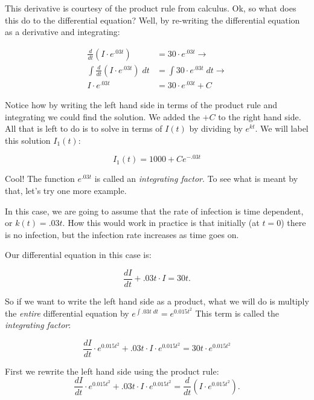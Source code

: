 \documentclass[
]{book}
\theoremstyle{definition}
\theoremstyle{definition}
\theoremstyle{definition}
\theoremstyle{remark}
\begin{document}
This derivative is courtesy of the product rule from calculus. Ok, so what does this do to the differential equation? Well, by re-writing the differential equation as a derivative and integrating:

\begin{equation}
\begin{split}
\frac{d}{dt} \left( I \cdot e^{.03t} \right) &= 30 \cdot e^{.03t} \rightarrow \\
\int \frac{d}{dt} \left( I \cdot e^{.03t} \right) \; dt &= \int 30 \cdot e^{.03t} \; dt \rightarrow \\
I \cdot e^{.03t} &= 30 \cdot e^{.03t} + C
\end{split}
\end{equation}

Notice how by writing the left hand side in terms of the product rule and integrating we could find the solution. We added the \(+C\) to the right hand side. All that is left to do is to solve in terms of \(I(t)\) by dividing by \(e^{kt}\). We will label this solution \(I_{1}(t)\):

\begin{equation}
I_{1}(t) = 1000 + Ce^{-.03t}  \label{eq:i1}
\end{equation}

Cool! The function \(e^{.03t}\) is called an \emph{integrating factor}. To see what is meant by that, let's try one more example.

In this case, we are going to assume that the rate of infection is time dependent, or \(k(t) = .03t\). How this would work in practice is that initially (at \(t=0\)) there is no infection, but the infection rate increases as time goes on.

Our differential equation in this case is:

\begin{equation*}
\frac{dI}{dt} + .03 t \cdot I = 30 t.
\end{equation*}

So if we want to write the left hand side as a product, what we will do is multiply the \emph{entire} differential equation by \(\displaystyle e^{\int .03t \; dt} = e^{ 0.015 t^{2}}\) This term is called the \emph{integrating factor}:

\begin{equation*}
\frac{dI}{dt} \cdot e^{ 0.015 t^{2}} + .03 t \cdot I \cdot e^{0.015 t^{2}} = 30 t \cdot e^{0.015 t^{2}}
\end{equation*}

First we rewrite the left hand side using the product rule:
\begin{equation*}
\frac{dI}{dt} \cdot e^{ 0.015 t^{2}} + .03 t \cdot I \cdot e^{0.015 t^{2}} = \frac{d}{dt} \left( I \cdot e^{0.015  t^{2}} \right). 
\end{equation*}
\end{document}
